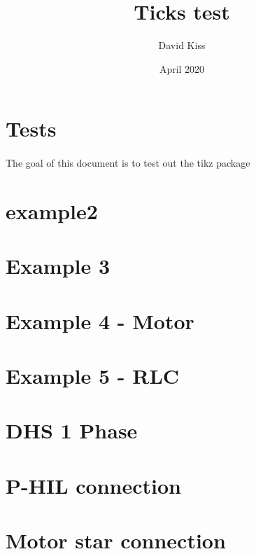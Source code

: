 \documentclass{article}
\title{Ticks test}
\author{David Kiss}
\date{April 2020}
\begin{document}
\maketitle

\section{Tests}
\paragraph{}The goal of this document is to test out the tikz package

\vspace{1cm}


\newpage
\section{example2}


\section{Example 3}


\section{Example 4 - Motor}


\section{Example 5 - RLC}


\section{DHS 1 Phase}


\section{P-HIL connection}



\section{Motor star connection}

\end{document}

